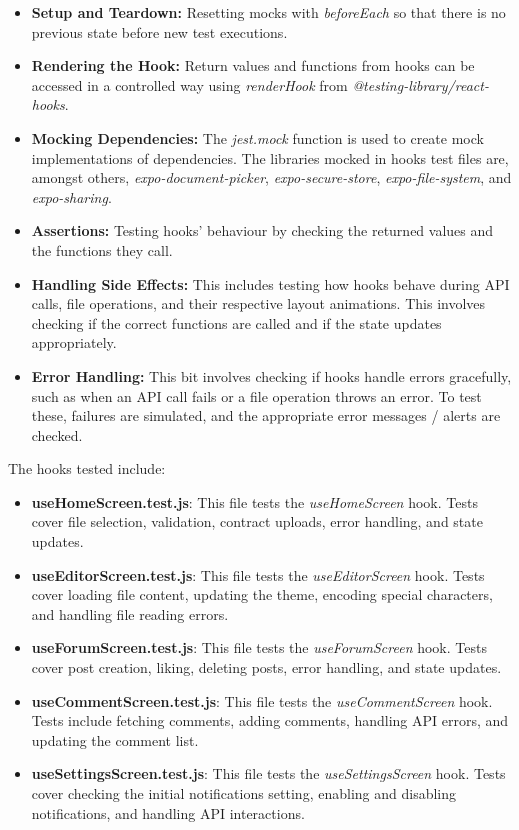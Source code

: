 \begin{itemize}
    \item \textbf{Setup and Teardown:} Resetting mocks with \textit{beforeEach} so that there is no previous state before new test executions. 
    \item \textbf{Rendering the Hook:} Return values and functions from hooks can be accessed in a controlled way using \textit{renderHook} from \textit{@testing-library/react-hooks}.
    \item \textbf{Mocking Dependencies:} The \textit{jest.mock} function is used to create mock implementations of dependencies. The libraries mocked in hooks test files are, amongst others, \textit{expo-document-picker}, \textit{expo-secure-store}, \textit{expo-file-system}, and \textit{expo-sharing}.
    \item \textbf{Assertions:} Testing hooks' behaviour by checking the returned values and the functions they call.
    \item \textbf{Handling Side Effects:} This includes testing how hooks behave during API calls, file operations, and their respective layout animations. This involves checking if the correct functions are called and if the state updates appropriately.
    \item \textbf{Error Handling:} This bit involves checking if hooks handle errors gracefully, such as when an API call fails or a file operation throws an error. To test these, failures are simulated, and the appropriate error messages / alerts are checked.
\end{itemize}

The hooks tested include:

\begin{itemize}
    \item \textbf{useHomeScreen.test.js}: This file tests the \textit{useHomeScreen} hook. Tests cover file selection, validation, contract uploads, error handling, and state updates.
    \item \textbf{useEditorScreen.test.js}: This file tests the \textit{useEditorScreen} hook. Tests cover loading file content, updating the theme, encoding special characters, and handling file reading errors.
    \item \textbf{useForumScreen.test.js}: This file tests the \textit{useForumScreen} hook. Tests cover post creation, liking, deleting posts, error handling, and state updates.
    \item \textbf{useCommentScreen.test.js}: This file tests the \textit{useCommentScreen} hook. Tests include fetching comments, adding comments, handling API errors, and updating the comment list.
    \item \textbf{useSettingsScreen.test.js}: This file tests the \textit{useSettingsScreen} hook. Tests cover checking the initial notifications setting, enabling and disabling notifications, and handling API interactions.
\end{itemize}

